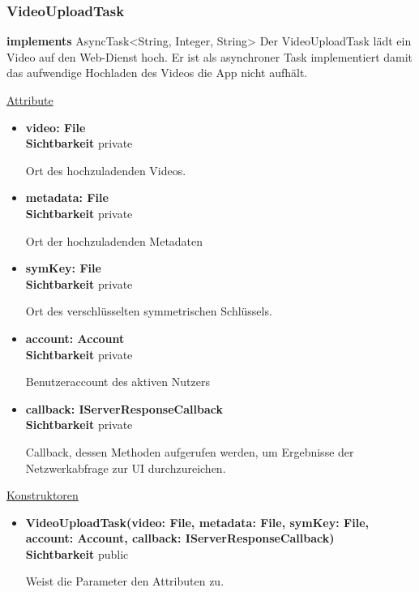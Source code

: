 \subsubsection{VideoUploadTask} \label{app:klasse:VideoUploadTask}
\textbf{implements} AsyncTask<String, Integer, String> \newline
Der VideoUploadTask lädt ein Video auf den Web-Dienst hoch. Er ist als asynchroner Task implementiert damit das aufwendige Hochladen des Videos die App nicht aufhält.\newline

\underline{Attribute}
\begin{itemize}
\itemsep0pt
\item \textbf{video: File} \hfill\\ 
\textbf{Sichtbarkeit} private

Ort des hochzuladenden Videos.

\item \textbf{metadata: File} \hfill\\ 
\textbf{Sichtbarkeit} private

Ort der hochzuladenden Metadaten

\item \textbf{symKey: File} \hfill\\ 
\textbf{Sichtbarkeit} private

Ort des verschlüsselten symmetrischen Schlüssels.

\item \textbf{account: Account} \hfill\\ 
\textbf{Sichtbarkeit} private

Benutzeraccount des aktiven Nutzers

\item \textbf{callback: IServerResponseCallback} \hfill\\ 
\textbf{Sichtbarkeit} private

Callback, dessen Methoden aufgerufen werden, um Ergebnisse der Netzwerkabfrage zur UI durchzureichen.
\end{itemize}

\underline{Konstruktoren}
\begin{itemize}
\itemsep0pt
\item \textbf{VideoUploadTask(video: File, metadata: File, symKey: File, account: Account, callback: IServerResponseCallback)} \hfill\\
\textbf{Sichtbarkeit} public

Weist die Parameter den Attributen zu.
\end{itemize}

